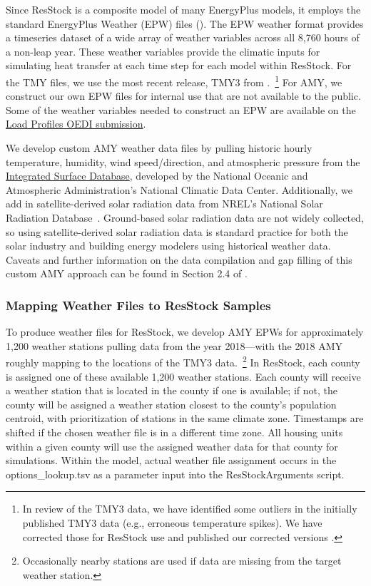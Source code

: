 Since ResStock is a composite model of many EnergyPlus models, it employs the standard EnergyPlus Weather (EPW) files (\cite{BigLadderSoftware2015}). The EPW weather format provides a timeseries dataset of a wide array of weather variables across all 8,760 hours of a non-leap year. These weather variables provide the climatic inputs for simulating heat transfer at each time step for each model within ResStock. For the TMY files, we use the most recent release, TMY3 from \citet{Wilcox2008}.~\footnote{In review of the TMY3 data, we have identified some outliers in the initially published TMY3 data (e.g., erroneous temperature spikes). We have corrected those for ResStock use and published our corrected versions \citep{Bianchi2021}. }  For AMY,  we construct our own EPW files for internal use that are not available to the public. Some of the weather variables needed to construct an EPW are available on the \href{https://data.openei.org/submissions/4520}{Load Profiles OEDI submission}. 

We develop custom AMY weather data files by pulling historic hourly temperature, humidity, wind speed/direction, and atmospheric pressure from the \href{https://www.ncei.noaa.gov/products/land-based-station/integrated-surface-database}{Integrated Surface Database}, developed by the National Oceanic and Atmospheric Administration's National Climatic Data Center. Additionally, we add in satellite-derived solar radiation data from NREL’s National Solar Radiation Database~\citep{nsrdb}. Ground-based solar radiation data are not widely collected, so using satellite-derived solar radiation data is standard practice for both the solar industry and building energy modelers using historical weather data. Caveats and further information on the data compilation and gap filling of this custom AMY approach can be found in Section 2.4 of \citet{Wilson2022}. 

\subsubsection{Mapping Weather Files to ResStock Samples}
To produce weather files for ResStock, we develop AMY EPWs for approximately 1,200 weather stations pulling data from the year 2018---with the 2018 AMY roughly mapping to the locations of the TMY3 data.~\footnote{Occasionally nearby stations are used if data are missing from the target weather station.} In ResStock, each county is assigned one of these available 1,200  weather stations. Each county will receive a weather station that is located in the county if one is available; if not, the county will be assigned a weather station closest to the county's population centroid, with prioritization of stations in the same climate zone. Timestamps are shifted if the chosen weather file is in a different time zone. All housing units within a given county will use the assigned weather data for that county for simulations. Within the model, actual weather file assignment occurs in the options\_lookup.tsv as a parameter input into the ResStockArguments script. 

